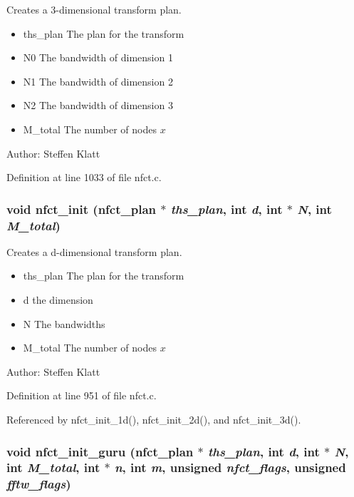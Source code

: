 Creates a 3-dimensional transform plan. 

\begin{itemize}
\item ths\_\-plan The plan for the transform \item N0 The bandwidth of dimension 1 \item N1 The bandwidth of dimension 2 \item N2 The bandwidth of dimension 3 \item M\_\-total The number of nodes $x$\end{itemize}
\begin{Desc}
\item[Author:]Steffen Klatt \end{Desc}


Definition at line 1033 of file nfct.c.\hypertarget{group__nfsct_g69ac40972c84cfd04909723da056004b}{
\subsubsection{\setlength{\rightskip}{0pt plus 5cm}void nfct\_\-init ({\bf nfct\_\-plan} $\ast$ {\em ths\_\-plan}, int {\em d}, int $\ast$ {\em N}, int {\em M\_\-total})}}
\label{group__nfsct_g69ac40972c84cfd04909723da056004b}


Creates a d-dimensional transform plan. 

\begin{itemize}
\item ths\_\-plan The plan for the transform \item d the dimension \item N The bandwidths \item M\_\-total The number of nodes $x$\end{itemize}
\begin{Desc}
\item[Author:]Steffen Klatt \end{Desc}


Definition at line 951 of file nfct.c.

Referenced by nfct\_\-init\_\-1d(), nfct\_\-init\_\-2d(), and nfct\_\-init\_\-3d().\hypertarget{group__nfsct_ga2f86c85130172f1151a85996ea1bfa3}{
\subsubsection{\setlength{\rightskip}{0pt plus 5cm}void nfct\_\-init\_\-guru ({\bf nfct\_\-plan} $\ast$ {\em ths\_\-plan}, int {\em d}, int $\ast$ {\em N}, int {\em M\_\-total}, int $\ast$ {\em n}, int {\em m}, unsigned {\em nfct\_\-flags}, unsigned {\em fftw\_\-flags})}}
\label{group__nfsct_ga2f86c85130172f1151a85996ea1bfa3}


